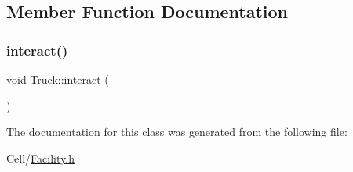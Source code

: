\subsection{Member Function Documentation}
\mbox{\label{classTruck_ade3385f07d9db954d329e3d5de180f2e}} 
\subsubsection{\texorpdfstring{interact()}{interact()}}
{\footnotesize\ttfamily void Truck\+::interact (\begin{DoxyParamCaption}{ }\end{DoxyParamCaption})}



The documentation for this class was generated from the following file\+:\begin{DoxyCompactItemize}
\item 
Cell/\mbox{\hyperlink{Facility_8h}{Facility.\+h}}\end{DoxyCompactItemize}
